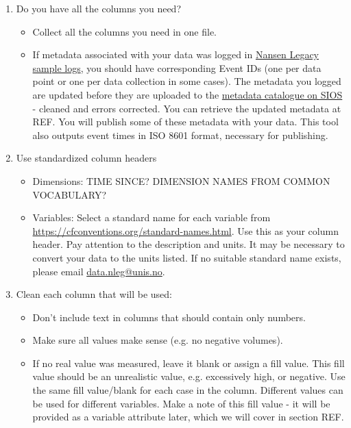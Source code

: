 \documentclass[a4paper,english, 11pt]{article}
\makeatletter
\newcommand{\emailme}{\href{mailto:data.nleg@unis.no}{data.nleg@unis.no}}
\makeatother
\begin{document}
\begin{enumerate}
\item Do you have all the columns you need?
\begin{itemize}
\item Collect all the columns you need in one file.
\item If metadata associated with your data was logged in \href{https://sios-svalbard.org/cgi-bin/darwinsheet/?setup=aen}{Nansen Legacy sample logs}, you should have corresponding Event IDs (one per data point or one per data collection in some cases). The metadata you logged are updated before they are uploaded to the \href{https://sios-svalbard.org/aen/tools}{metadata catalogue on SIOS} - cleaned and errors corrected. You can retrieve the updated metadata at REF. You will publish some of these metadata with your data. This tool also outputs event times in ISO 8601 format, necessary for publishing.    
\end{itemize}
\item Use standardized column headers
\begin{itemize}
\item Dimensions: 
TIME SINCE? DIMENSION NAMES FROM COMMON VOCABULARY?
\item Variables:
Select a standard name for each variable from \href{https://cfconventions.org/standard-names.html}{https://cfconventions.org/standard-names.html}. Use this as your column header. Pay attention to the description and units. It may be necessary to convert your data to the units listed. If no suitable standard name exists, please email \emailme.  
\end{itemize}
\item Clean each column that will be used:
\begin{itemize}
\item Don't include text in columns that should contain only numbers.
\item Make sure all values make sense (e.g. no negative volumes).
\item If no real value was measured, leave it blank or assign a fill value. This fill value should be an unrealistic value, e.g. excessively high, or negative. Use the same fill value/blank for each case in the column. Different values can be used for different variables. Make a note of this fill value - it will be provided as a variable attribute later, which we will cover in section REF.
\end{itemize}
\end{enumerate}
\end{document}
